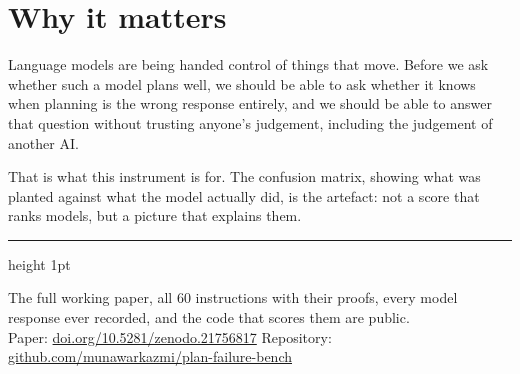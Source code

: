 \documentclass[11pt,a4paper]{article}
\begin{document}
\section{Why it matters}

Language models are being handed control of things that move. Before we ask whether such a model plans well, we should be able to ask whether it knows when planning is the wrong response entirely, and we should be able to answer that question without trusting anyone's judgement, including the judgement of another AI.

That is what this instrument is for. The confusion matrix, showing what was planted against what the model actually did, is the artefact: not a score that ranks models, but a picture that explains them.

\vspace{6pt}
{\color{rule}\hrule height 1pt}
\vspace{6pt}

{\small The full working paper, all 60 instructions with their proofs, every model response ever recorded, and the code that scores them are public.\\
Paper: \href{https://doi.org/10.5281/zenodo.21756817}{doi.org/10.5281/zenodo.21756817} \quad Repository: \href{https://github.com/munawarkazmi/plan-failure-bench}{github.com/munawarkazmi/plan-failure-bench}}
\end{document}
